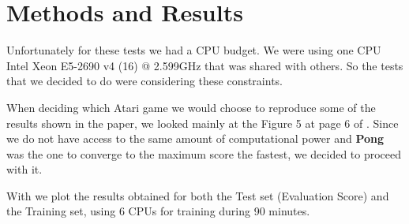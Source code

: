 \documentclass[10pt]{article} %
\begin{document}

\section{Methods and Results}
Unfortunately for these tests we had a CPU budget. We were using one CPU Intel Xeon E5-2690 v4 (16) @ 2.599GHz that was shared with others. So the tests that we decided to do were considering these constraints.

When deciding which Atari game we would choose to reproduce some of the results shown in the paper, we looked mainly at the Figure 5 at page 6 of \cite{back-to-basics}. Since we do not have access to the same amount of computational power and \textbf{Pong} was the one to converge to the maximum score the fastest, we decided to proceed with it.

With  we plot the results obtained for both the Test set (Evaluation Score) and the Training set, using 6 CPUs for training during 90 minutes. 
\end{document}
